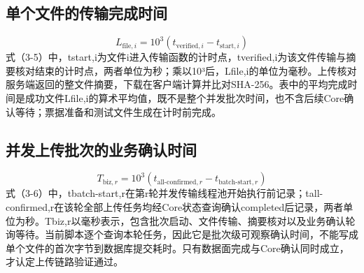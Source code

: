 \documentclass{ctexart}
\begin{document}
\subsection*{单个文件的传输完成时间}
\begin{equation}
L_{\mathrm{file},i}=10^3\left(t_{\mathrm{verified},i}-t_{\mathrm{start},i}\right)\tag{3-5}
\end{equation}
式（3-5）中，tstart,i为文件i进入传输函数的计时点，tverified,i为该文件传输与摘要核对结束的计时点，两者单位为秒；乘以10³后，Lfile,i的单位为毫秒。上传核对服务端返回的整文件摘要，下载在客户端计算并比对SHA-256。表中的平均完成时间是成功文件Lfile,i的算术平均值，既不是整个并发批次时间，也不含后续Core确认等待；票据准备和测试文件生成在计时前完成。
\subsection*{并发上传批次的业务确认时间}
\begin{equation}
T_{\mathrm{biz},r}=10^3\left(t_{\mathrm{all\mbox{-}confirmed},r}-t_{\mathrm{batch\mbox{-}start},r}\right)\tag{3-6}
\end{equation}
式（3-6）中，tbatch-start,r在第r轮并发传输线程池开始执行前记录；tall-confirmed,r在该轮全部上传任务均经Core状态查询确认completed后记录，两者单位为秒。Tbiz,r以毫秒表示，包含批次启动、文件传输、摘要核对以及业务确认轮询等待。当前脚本逐个查询本轮任务，因此它是批次级可观察确认时间，不能写成单个文件的首次字节到数据库提交耗时。只有数据面完成与Core确认同时成立，才认定上传链路验证通过。
\end{document}
